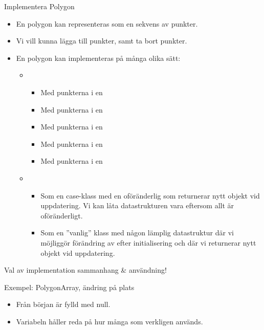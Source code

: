 \begin{Slide}{Implementera Polygon}
\begin{itemize}
\item En polygon kan representeras som en sekvens av punkter.
\item Vi vill kunna lägga till punkter, samt ta bort punkter.
\item En polygon kan implementeras på många olika sätt:
\pause
\begin{itemize}
\item {} 
\begin{itemize}
\item Med punkterna i en 
\item Med punkterna i en 
\item Med punkterna i en 
\item Med punkterna i en 
\item Med punkterna i en 
\end{itemize}
\item {} 
\begin{itemize}
\item Som en case-klass med en oföränderlig  som returnerar nytt objekt vid uppdatering. Vi kan låta datastrukturen vara  eftersom allt är oföränderligt.
\item Som en ''vanlig'' klass med någon lämplig  datastruktur där vi  möjliggör förändring av efter initialisering och där vi returnerar nytt objekt vid uppdatering.
\end{itemize}
\end{itemize}
\end{itemize}
\pause
Val av implementation  sammanhang \& användning!
\end{Slide}




\begin{Slide}{Exempel: PolygonArray, ändring på plats}
\ifkompendium
{}
\begin{itemize}
\item Från början är  fylld med null. 
\item Variabeln  håller reda på hur många som verkligen används.
\end{itemize}
\else
\vspace{-0.6em}
\fi
\end{Slide}

